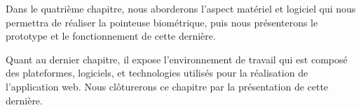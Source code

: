 Dans le quatrième chapitre, nous aborderons l’aspect matériel et logiciel qui
nous permettra de réaliser la pointeuse biométrique, puis nous présenterons le
prototype et le fonctionnement de cette dernière.
\clearpage

Quant au dernier chapitre, il expose l’environnement de travail qui est composé
des plateformes, logiciels, et technologies utilisés pour la réalisation de
l’application web. Nous clôturerons ce chapitre par la présentation de
cette dernière.
